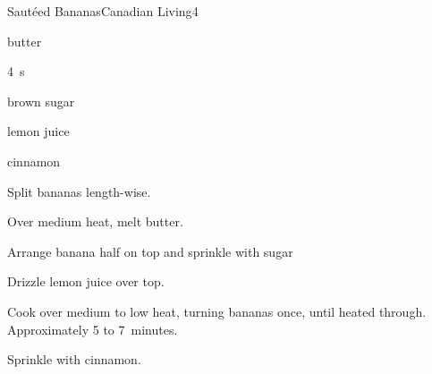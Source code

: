 \begin{recipe}{Saut\'{e}ed Bananas}{Canadian Living}{4}

\begin{ingredients}
\item {} butter
\item 4~s
\item \C{\quarter} brown sugar
\item {} lemon juice
\item cinnamon
\end{ingredients}

\begin{directions}
\item Split bananas length-wise.
\item Over medium heat, melt butter.
\item Arrange banana half on top and sprinkle with sugar
\item Drizzle lemon juice over top.
\item Cook over medium to low heat, turning bananas once, until heated through. Approximately 5 to 7~minutes.
\item Sprinkle with cinnamon.
\end{directions}


\end{recipe}
